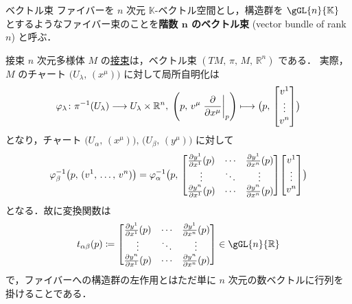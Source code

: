 \documentclass[TQFT_main]{subfiles}
\begin{document}
\begin{mydef}[label=def:vect]{ベクトル束}
    ファイバーを $n$ 次元 $\mathbb{K}$-ベクトル空間とし，構造群を $\gGL{n}{\mathbb{K}}$ とするようなファイバー束のことを\textbf{階数 $\bm{n}$ のベクトル束} (vector bundle of rank $n$) と呼ぶ．
\end{mydef}

\begin{myexample}[label=ex:tangentbundle]{接束}
    $n$ 次元\cinfty 多様体 $M$ の\hyperref[def:tangentbundle]{接束}は，ベクトル束
    $(TM,\, \pi,\, M,\, \mathbb{R}^n)$ である．
    実際，$M$ のチャート $\bigl( U_\lambda,\, (x^\mu) \bigr)$ に対して局所自明化は
    \begin{align}
        \varphi_\lambda \colon \pi^{-1} (U_\lambda) \lto U_\lambda \times \mathbb{R}^n,\; \left(p,\, v^\mu \eval{\pdv{}{x^\mu}}_p \right) \lmto \bigl(p,\, \mqty[v^1 \\ \vdots \\ v^n] \bigr)
    \end{align}
    となり，チャート $\bigl( U_\alpha,\, (x^\mu) \bigr),\, \bigl( U_\beta,\, (y^\mu) \bigr)$ に対して
    \begin{align}
        \varphi_\beta^{-1} \bigl( p,\, (v^1,\, \dots,\, v^n) \bigr) = \varphi_\alpha^{-1} \bigl( p,\, \mqty[\pdv{y^1}{x^1}()(p) &\cdots &\pdv{y^1}{x^n}()(p) \\ \vdots &\ddots &\vdots \\ \pdv{y^n}{x^1}()(p) &\cdots &\pdv{y^n}{x^n}()(p)]\mqty[v^1 \\ \vdots \\ v^n] \bigr) 
    \end{align}
    となる．故に変換関数は
    \begin{align}
        t_{\alpha\beta} (p) \coloneqq \mqty[\pdv{y^1}{x^1}()(p) &\cdots &\pdv{y^1}{x^n}()(p) \\ \vdots &\ddots &\vdots \\ \pdv{y^n}{x^1}()(p) &\cdots &\pdv{y^n}{x^n}()(p)] \in \gGL{n}{\mathbb{R}}
    \end{align}
    で，ファイバーへの構造群の左作用とはただ単に $n$ 次元の数ベクトルに行列を掛けることである．
\end{myexample}



\end{document}
